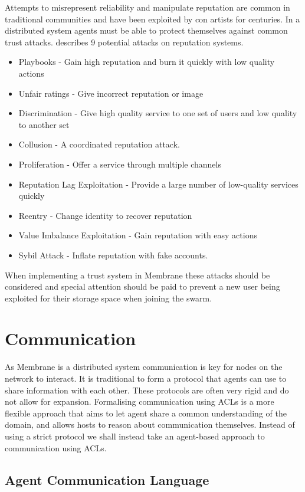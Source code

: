 \documentclass[11pt, a4paper, twocolumn, twoside]{report}
\begin{document}
Attempts to misrepresent reliability and manipulate reputation are common in traditional communities and have been exploited by con artists for centuries. In a distributed system agents must be able to protect themselves against common trust attacks. \cite{josang2009challenges} describes 9 potential attacks on reputation systems.
\begin{itemize}
 \item Playbooks - Gain high reputation and burn it quickly with low quality actions
 \item Unfair ratings - Give incorrect reputation or image
 \item Discrimination - Give high quality service to one set of users and low quality to another set
 \item Collusion - A coordinated reputation attack.
 \item Proliferation - Offer a service through multiple channels
 \item Reputation Lag Exploitation - Provide a large number of low-quality services quickly
 \item Reentry - Change identity to recover reputation
 \item Value Imbalance Exploitation - Gain reputation with easy actions
 \item Sybil Attack - Inflate reputation with fake accounts.
\end{itemize}
When implementing a trust system in Membrane these attacks should be considered and special attention should be paid to prevent a new user being exploited for their storage space when joining the swarm.

\section{Communication} \label{sec:comm}

As Membrane is a distributed system communication is key for nodes on the network to interact. It is traditional to form a protocol that agents can use to share information with each other. These protocols are often very rigid and do not allow for expansion. Formalising communication using ACLs is a more flexible approach that aims to let agent share a common understanding of the domain, and allows hosts to reason about communication themselves. Instead of using a strict protocol we shall instead take an agent-based approach to communication using ACLs.

\subsection{Agent Communication Language}
\end{document}
